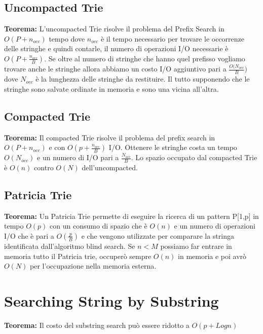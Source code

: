 \documentclass[12pt]{article}
\begin{document}
\subsection{Uncompacted Trie}

\textbf{Teorema:} L'uncompacted Trie risolve il problema del Prefix Search in $O(P+n_{occ})$ tempo dove $n_{occ}$ è il tempo necessario per trovare le occorrenze delle stringhe e quindi contarle, il numero di operazioni I/O necessarie è $O(P+\frac{n_{occ}}{B})$. Se oltre al numero di stringhe che hanno quel prefisso vogliamo trovare anche le stringhe allora abbiamo un costo I/O aggiuntivo pari a $\frac{O(N_{occ}}{B})$ dove $N_{occ}$ è la lunghezza delle stringhe da restituire.
Il tutto supponendo che le stringhe sono salvate ordinate in memoria e sono una vicina all'altra.

\subsection{Compacted Trie}

\textbf{Teorema:} Il compacted Trie risolve il problema del prefix search in $O(P+n_{occ})$ e con $O(p+\frac{n_{occ}}{B})$ I/O.
Ottenere le stringhe costa un tempo $O(N_{occ})$ e un numero di I/O pari a $\frac{N_{occ}}{B}$. Lo spazio occupato dal compacted Trie è $O(n)$ contro $O(N)$ dell'uncompacted.


\subsection{Patricia Trie}

\textbf{Teorema:} Un Patricia Trie permette di eseguire la ricerca di un pattern P[1,p] in tempo $O(p)$ con un consumo di spazio che è $O(n)$ e un numero di operazioni I/O che è pari a $O(\frac{p}{B})$ e che vengono utilizzate per comparare la stringa identificata dall'algoritmo blind search.
Se $n<M$ possiamo far entrare in memoria tutto il Patricia trie, occuperò sempre $O(n)$ in memoria e poi avrò $O(N)$ per l'occupazione nella memoria esterna.



\section{Searching String by Substring}


\textbf{Teorema:} Il costo del substring search può essere ridotto a $O(p+Logn)$
\end{document}
